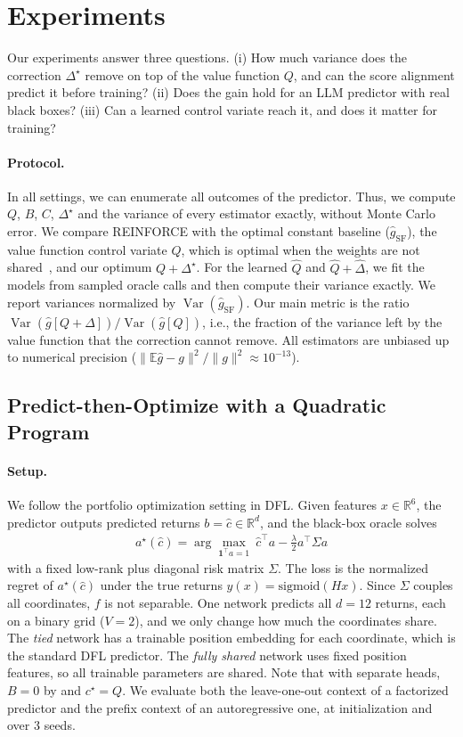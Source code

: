\documentclass[10pt]{article}
\providecommand{\E}{\mathbb{E}}
\providecommand{\Var}{\operatorname{Var}}
\providecommand{\R}{\mathbb{R}}
\theoremstyle{plain}
\theoremstyle{definition}
\theoremstyle{remark}
\theoremstyle{definition}
\newcommand{\ghat}[1]{\hat g[#1]}            %
\newcommand{\gtrue}{g}                       %
\newcommand{\rf}{\hat g_{\mathrm{SF}}}       %
\newcommand{\Dstar}{\Delta^{\star}}
\newcommand{\cstar}{c^{\star}}
\begin{document}
\section{Experiments}\label{sec:exp}
Our experiments answer three questions. (i) How much variance does the correction $\Dstar$ remove on top of the value function $Q$, and can the score alignment predict it before training? (ii) Does the gain hold for an LLM predictor with real black boxes? (iii) Can a learned control variate reach it, and does it matter for training?

\paragraph{Protocol.} In all settings, we can enumerate all outcomes of the predictor. Thus, we compute $Q$, $B$, $C$, $\Dstar$ and the variance of every estimator exactly, without Monte Carlo error. We compare REINFORCE with the optimal constant baseline ($\rf$), the value function control variate $Q$, which is optimal when the weights are not shared~\cite{tokui2017}, and our optimum $Q{+}\Dstar$. For the learned $\hat Q$ and $\hat Q{+}\hat\Delta$, we fit the models from sampled oracle calls and then compute their variance exactly. We report variances normalized by $\Var(\rf)$. Our main metric is the ratio $\Var(\ghat{Q+\Delta})/\Var(\ghat{Q})$, i.e., the fraction of the variance left by the value function that the correction cannot remove. All estimators are unbiased up to numerical precision ($\|\E\hat g-\gtrue\|^2/\|\gtrue\|^2\approx10^{-13}$).

\subsection{Predict-then-Optimize with a Quadratic Program}\label{sec:toy}
\paragraph{Setup.} We follow the portfolio optimization setting in DFL. Given features $x\in\R^{6}$, the predictor outputs predicted returns $b=\hat c\in\R^{d}$, and the black-box oracle solves
\begin{align}
    a^{\star}(\hat c)=\arg\max_{\mathbf 1^{\top}a=1}\ \hat c^{\top}a-\tfrac{\lambda}{2}a^{\top}\Sigma a
\end{align}
with a fixed low-rank plus diagonal risk matrix $\Sigma$. The loss is the normalized regret of $a^{\star}(\hat c)$ under the true returns $y(x)=\mathrm{sigmoid}(Hx)$. Since $\Sigma$ couples all coordinates, $f$ is not separable. One network predicts all $d=12$ returns, each on a binary grid ($V=2$), and we only change how much the coordinates share. The \emph{tied} network has a trainable position embedding for each coordinate, which is the standard DFL predictor. The \emph{fully shared} network uses fixed position features, so all trainable parameters are shared. Note that with separate heads, $B=0$ by  and $\cstar=Q$. We evaluate both the leave-one-out context of a factorized predictor and the prefix context of an autoregressive one, at initialization and over $3$ seeds.
\end{document}

